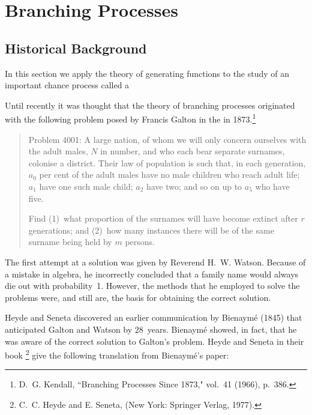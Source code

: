 \section{Branching Processes}\label{sec 10.2}
\subsection*{Historical Background}
In this section we apply the theory of generating functions to the study of an
important chance process called a 

Until recently it was thought that the theory of branching processes originated
with the following problem posed by Francis Galton in the  in 1873.\footnote{D.~G. Kendall, ``Branching Processes Since
1873,"  vol.~41 (1966), p.~386.}
\begin{quote}
Problem 4001: A large nation, of whom we will only concern ourselves with the
adult males, $N$ in number, and who each bear separate surnames, colonise a
district.  Their law of population is such that, in each generation, $a_0$ 
per cent of the adult males have no male children who reach adult life;
$a_1$ have one such male child; $a_2$ have two; and so on up to
$a_5$ who have five.

Find (1)~what proportion of the surnames will have become extinct after $r$
generations; and (2)~how many instances there will be of the same surname being
held by $m$ persons.
\end{quote}

The first attempt at a solution was given by Reverend H.~W. Watson. 
Because of a mistake in algebra, he incorrectly concluded that a family name would always
die out with probability~1.  However, the methods that he employed to solve the
problems were, and still are, the basis for obtaining the correct solution.
\par
Heyde and Seneta discovered an earlier communication by
Bienaym\'e (1845) that anticipated Galton and Watson by 28~years. 
Bienaym\'e showed, in fact, that he was aware of the correct solution to Galton's problem. 
Heyde and Seneta in their book \footnote{C.~C. Heyde and E. Seneta,  (New York: Springer Verlag, 1977).} give the
following translation from Bienaym\'e's paper:

